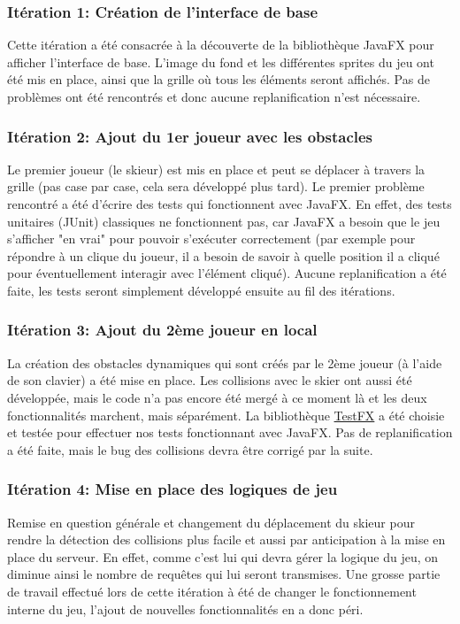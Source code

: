 \documentclass[a4paper,12pt]{article}
\begin{document}
	\subsubsection{Itération 1: Création de l'interface de base}
	Cette itération a été consacrée à la découverte de la bibliothèque JavaFX pour afficher l'interface de base. L'image du fond et les différentes sprites du jeu ont été mis en place, ainsi que la grille où tous les éléments seront affichés. Pas de problèmes ont été rencontrés et donc aucune replanification n'est nécessaire.
	
	\subsubsection{Itération 2: Ajout du 1er joueur avec les obstacles}
	Le premier joueur (le skieur) est mis en place et peut se déplacer à travers la grille (pas case par case, cela sera développé plus tard). Le premier problème rencontré a été d'écrire des tests qui fonctionnent avec JavaFX. En effet, des tests unitaires (JUnit) classiques ne fonctionnent pas, car JavaFX a besoin que le jeu s'afficher "en vrai" pour pouvoir s'exécuter correctement (par exemple pour répondre à un clique du joueur, il a besoin de savoir à quelle position il a cliqué pour éventuellement interagir avec l'élément cliqué). Aucune replanification a été faite, les tests seront simplement développé ensuite au fil des itérations.
	
	\subsubsection{Itération 3: Ajout du 2ème joueur en local}
	La création des obstacles dynamiques qui sont créés par le 2ème joueur (à l'aide de son clavier) a été mise en place. Les collisions avec le skier ont aussi été développée, mais le code n'a pas encore été mergé à ce moment là et les deux fonctionnalités marchent, mais séparément. La bibliothèque \href{https://github.com/TestFX/TestFX}{TestFX}	a été choisie et testée pour effectuer nos tests fonctionnant avec JavaFX. Pas de replanification a été faite, mais le bug des collisions devra être corrigé par la suite.
	
	\subsubsection{Itération 4: Mise en place des logiques de jeu}
	Remise en question générale et changement du déplacement du skieur pour rendre la détection des collisions plus facile et aussi par anticipation à la mise en place du serveur. En effet, comme c'est lui qui devra gérer la logique du jeu, on diminue ainsi le nombre de requêtes qui lui seront transmises. Une grosse partie de travail effectué lors de cette itération à été de changer le fonctionnement interne du jeu, l'ajout de nouvelles fonctionnalités en a donc péri.
	
\end{document}
